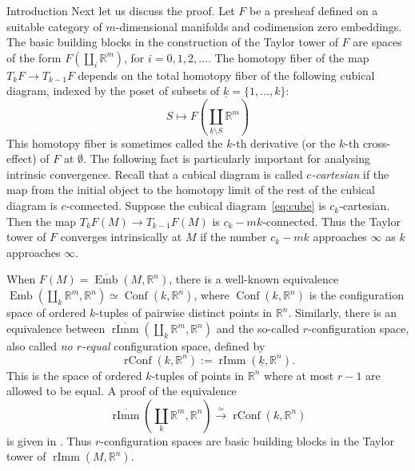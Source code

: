 \documentclass[12pt]{amsart}
\newcommand{\R}{{\mathbb R}}
\newcommand{\Emb}{\operatorname{Emb}}
\newcommand{\Ebar}{\overline{\Emb}}
\newcommand{\rImm}{\operatorname{rImm}}
\newcommand{\rbar}{\overline{\rImm}}
\newcommand{\Conf}{\operatorname{Conf}}
\newcommand{\rConf}{\operatorname{rConf}}
\theoremstyle{plain}
\theoremstyle{definition}
\theoremstyle{remark}
\begin{document}
\begin{section}{Introduction}
Next let us discuss the proof. Let $F$ be a presheaf defined on a suitable category of $m$-dimensional manifolds and codimension zero embeddings. The basic building blocks in the construction of the Taylor tower of $F$ are spaces of the form $F(\coprod_i \R^m)$, for $i=0,1,2,\ldots$. The homotopy fiber of the map $T_kF \to T_{k-1}F$ depends on the total homotopy fiber of the following cubical diagram, indexed by the poset of subsets of $\underline{k}=\{1, \ldots, k\}$:
\begin{equation}\label{eq:cube}
S\mapsto F\left(\coprod_{\underline{k}\setminus S} \R^m\right)
\end{equation}
This homotopy fiber is sometimes called the $k$-th derivative (or the $k$-th cross-effect) of $F$ at $\emptyset$. The following fact is particularly important for analysing intrinsic convergence. Recall that a cubical diagram is called {\it $c$-cartesian} if the map from the initial object to the homotopy limit of the rest of the cubical diagram is $c$-connected. Suppose the cubical diagram~\eqref{eq:cube} is $c_k$-cartesian. Then the map $T_kF(M) \to T_{k-1}F(M)$ is $c_k-mk$-connected. Thus the Taylor tower of $F$ converges intrinsically at $M$ if the number $c_k-mk$ approaches $\infty$ as $k$ approaches $\infty$.

When $F(M)=\Ebar(M, \R^n)$, there is a well-known equivalence $\Ebar(\coprod_k \R^m, \R^n)\simeq \Conf(k,\R^n)$, where $\Conf(k,\R^n)$ is the configuration space of ordered $k$-tuples of pairwise distinct points in $\R^n$.
Similarly, there is an equivalence between $\rbar(\coprod_k \R^m, \R^n)$ and the so-called $r$-configuration space, also called \textit{no $r$-equal} configuration space, defined by $$\rConf(k,\R^n):= \rImm(\underline{k},\R^n).$$ 
This is the space of ordered $k$-tuples of points in $\R^n$ where at most $r-1$ are allowed to be equal. A proof of the equivalence 
\[
\rbar(\coprod_k \R^m, \R^n)\xrightarrow{\simeq}\rConf(k, \R^n)
\]
is given in \cite{AS:rimmrconf}. Thus $r$-configuration spaces are basic building blocks in the Taylor tower of $\rImm(M, \R^n)$.



\end{section}
\end{document}
